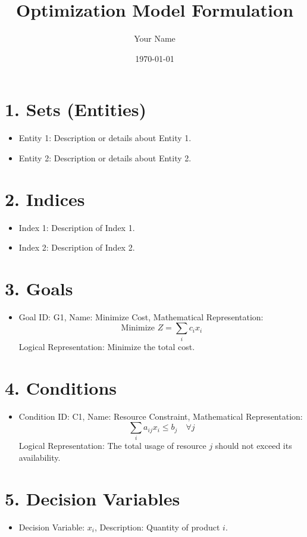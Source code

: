 \documentclass[a4paper,12pt]{article}
\title{Optimization Model Formulation}
\author{Your Name}
\date{\today}
\begin{document}
\maketitle

\tableofcontents
\newpage

\section{1. Sets (Entities)}
\begin{itemize}[noitemsep]
    \item Entity 1: Description or details about Entity 1.
    \item Entity 2: Description or details about Entity 2.
\end{itemize}

\section{2. Indices}
\begin{itemize}[noitemsep]
    \item Index 1: Description of Index 1.
    \item Index 2: Description of Index 2.
\end{itemize}

\section{3. Goals}
\begin{itemize}[noitemsep]
    \item Goal ID: G1, Name: Minimize Cost, Mathematical Representation:
    \[
    \text{Minimize } Z = \sum_{i} c_i x_i
    \]
    Logical Representation: Minimize the total cost.
\end{itemize}

\section{4. Conditions}
\begin{itemize}[noitemsep]
    \item Condition ID: C1, Name: Resource Constraint, Mathematical Representation:
    \[
    \sum_{i} a_{ij} x_i \leq b_j \quad \forall j
    \]
    Logical Representation: The total usage of resource \(j\) should not exceed its availability.
\end{itemize}

\section{5. Decision Variables}
\begin{itemize}[noitemsep]
    \item Decision Variable: \(x_i\), Description: Quantity of product \(i\).
\end{itemize}
\end{document}
